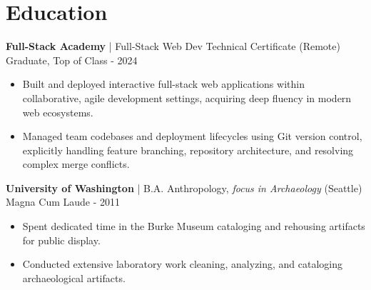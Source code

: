 \documentclass[10pt,letterpaper]{article}
\begin{document}
\section{Education}

\textbf{Full-Stack Academy} | Full-Stack Web Dev Technical Certificate (Remote) \hfill Graduate, Top of Class - 2024
\begin{itemize}
    \item Built and deployed interactive full-stack web applications within collaborative, agile development settings, acquiring deep fluency in modern web ecosystems.
    \item Managed team codebases and deployment lifecycles using Git version control, explicitly handling feature branching, repository architecture, and resolving complex merge conflicts.
\end{itemize}

\textbf{University of Washington} | B.A. Anthropology, \textit{focus in Archaeology} (Seattle) \hfill Magna Cum Laude - 2011
\begin{itemize}
    \item Spent dedicated time in the Burke Museum cataloging and rehousing artifacts for public display.
    \item Conducted extensive laboratory work cleaning, analyzing, and cataloging archaeological artifacts.
\end{itemize}
\end{document}
